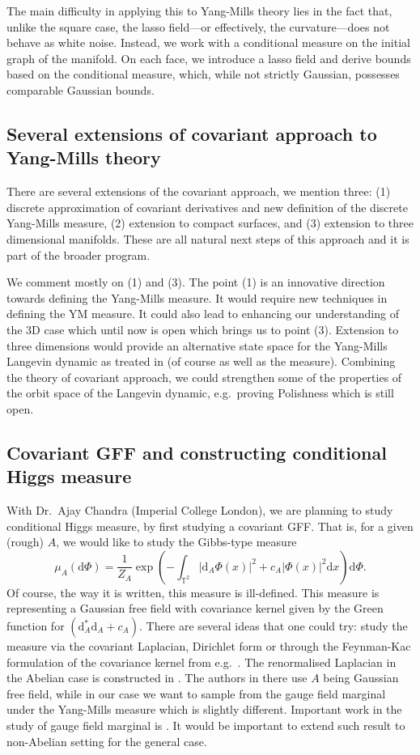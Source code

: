 \documentclass[12pt]{article}
\numberwithin{equation}{section}
\theoremstyle{definition}
\theoremstyle{remark}
\newcommand{\diff}{\mathrm{d}}
\newcommand{\1}{\mathbf 1}
\newcommand{\<}{\langle}
\renewcommand{\>}{\rangle}
\newcommand{\bT}{\mathbb T}
\begin{document}
The main difficulty in applying this to Yang-Mills theory lies in the fact that, unlike the square case, the lasso field—or effectively, the curvature—does not behave as white noise. Instead, we work with a conditional measure on the initial graph of the manifold. On each face, we introduce a lasso field and derive bounds based on the conditional measure, which, while not strictly Gaussian, possesses comparable Gaussian bounds.
%
\subsection{Several extensions of covariant approach to Yang-Mills theory}\label{sec:ext_Dirac}
%
There are several extensions of the covariant approach, we mention three: (1) discrete approximation of covariant derivatives and new definition of the discrete Yang-Mills measure, (2) extension to compact surfaces, and (3) extension to three dimensional manifolds.  These are all natural next steps of this approach and it is part of the broader program. 

We comment mostly on (1) and (3). The point (1) is an innovative direction towards defining the Yang-Mills measure. It would require new techniques in defining the YM measure. It could also lead to enhancing our understanding of the 3D case which until now is open which brings us to point (3). Extension to three dimensions would provide an alternative state space for the Yang-Mills Langevin dynamic as treated in \cite{CCHS3d} (of course as well as the measure). Combining the theory of covariant approach, we could strengthen some of the properties of the orbit space of the Langevin dynamic, e.g.\ proving Polishness which is still open.   


\subsection{Covariant GFF and constructing conditional Higgs measure}
With Dr.\ Ajay Chandra (Imperial College London), we are planning to study conditional Higgs measure, by first studying a covariant GFF. That is, for a given (rough) $A$, we would like to study the Gibbs-type measure
\[
\mu_A(\diff\Phi)=\frac 1 {Z_A} \exp\left( -\int_{\bT^2}|\diff_A\Phi(x)|^2+c_A|\Phi(x)|^2\diff x\right)\diff\Phi. 
\]
Of course, the way it is written, this measure is ill-defined. This measure is representing a Gaussian free field with covariance kernel given by the Green function for $(\diff_A^*\diff_A+c_A)$. There are several ideas that one could try: study the measure via the covariant Laplacian, Dirichlet form or through the Feynman-Kac formulation of the covariance kernel from e.g.\ \cite{SP24}. The renormalised Laplacian in the Abelian case is constructed in \cite{MM22}. The authors in there use $A$ being Gaussian free field, while in our case we want to sample from the gauge field marginal under the Yang-Mills measure which is slightly different. Important work in the study of gauge field marginal is \cite{CC24}. It would be important to extend such result to non-Abelian setting for the general case.   
\end{document}
